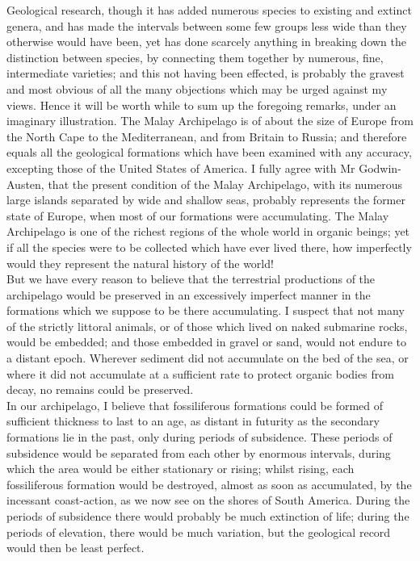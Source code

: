 \indent Geological research, though it has added numerous species to existing and extinct genera, and has made the intervals between some few groups less wide than they otherwise would have been, yet has done scarcely anything in breaking down the distinction between species, by connecting them together by numerous, fine, intermediate varieties; and this not having been effected, is probably the gravest and most obvious of all the many objections which may be urged against my views. Hence it will be worth while to sum up the foregoing remarks, under an imaginary illustration. The Malay Archipelago is of about the size of Europe from the North Cape to the Mediterranean, and from Britain to Russia; and therefore equals all the geological formations which have been examined with any accuracy, excepting those of the United States of America. I fully agree with Mr Godwin-Austen, that the present condition of the Malay Archipelago, with its numerous large islands separated by wide and shallow seas, probably represents the former state of Europe, when most of our formations were accumulating. The Malay Archipelago is one of the richest regions of the whole world in organic beings; yet if all the species were to be collected which have ever lived there, how imperfectly would they represent the natural history of the world!\\
\indent But we have every reason to believe that the terrestrial productions of the archipelago would be preserved in an excessively imperfect manner in the formations which we suppose to be there accumulating. I suspect that not many of the strictly littoral animals, or of those which lived on naked submarine rocks, would be embedded; and those embedded in gravel or sand, would not endure to a distant epoch. Wherever sediment did not accumulate on the bed of the sea, or where it did not accumulate at a sufficient rate to protect organic bodies from decay, no remains could be preserved.\\
\indent In our archipelago, I believe that fossiliferous formations could be formed of sufficient thickness to last to an age, as distant in futurity as the secondary formations lie in the past, only during periods of subsidence. These periods of subsidence would be separated from each other by enormous intervals, during which the area would be either stationary or rising; whilst rising, each fossiliferous formation would be destroyed, almost as soon as accumulated, by the incessant coast-action, as we now see on the shores of South America. During the periods of subsidence there would probably be much extinction of life; during the periods of elevation, there would be much variation, but the geological record would then be least perfect.\\
